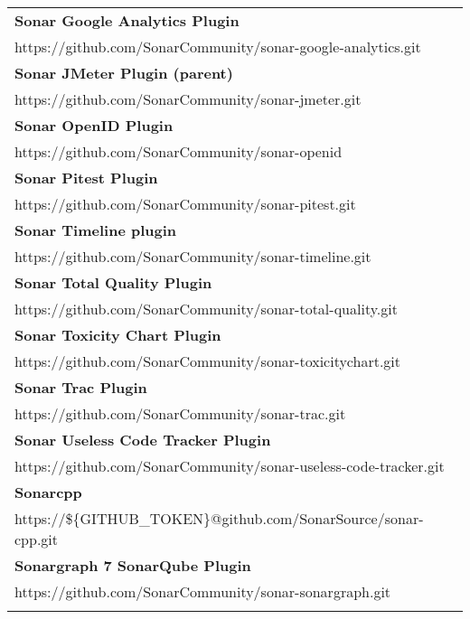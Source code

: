 \begin{table}[]
\small
\begin{tabular}{|p{130mm}|}
\hline 
\bf Sonar Google Analytics Plugin                      \\ https://github.com/SonarCommunity/sonar-google-analytics.git                 \\ \hline \bf
Sonar JMeter Plugin (parent)                       \\ https://github.com/SonarCommunity/sonar-jmeter.git                           \\ \hline \bf
Sonar OpenID Plugin                                \\ https://github.com/SonarCommunity/sonar-openid                               \\ \hline \bf
Sonar Pitest Plugin                                \\ https://github.com/SonarCommunity/sonar-pitest.git                           \\ \hline \bf
Sonar Timeline plugin                              \\ https://github.com/SonarCommunity/sonar-timeline.git                         \\ \hline \bf 
Sonar Total Quality Plugin                         \\ https://github.com/SonarCommunity/sonar-total-quality.git                    \\ \hline \bf
Sonar Toxicity Chart Plugin                        \\ https://github.com/SonarCommunity/sonar-toxicitychart.git                    \\ \hline \bf
Sonar Trac Plugin                                  \\ https://github.com/SonarCommunity/sonar-trac.git                             \\ \hline \bf
Sonar Useless Code Tracker Plugin                  \\ https://github.com/SonarCommunity/sonar-useless-code-tracker.git             \\ \hline \bf
Sonarcpp                                           \\ https://\$\{GITHUB\_TOKEN\}@github.com/SonarSource/sonar-cpp.git             \\ \hline \bf
Sonargraph 7 SonarQube Plugin                      \\ https://github.com/SonarCommunity/sonar-sonargraph.git                       \\ \hline \bf

\end{tabular}
\end{table}
